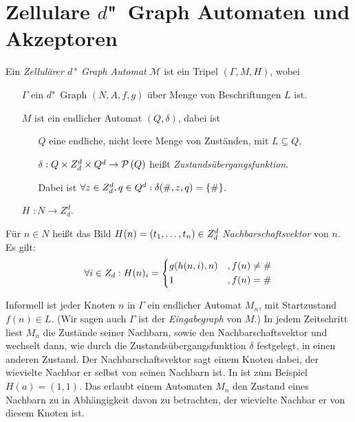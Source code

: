 \documentclass[11pt]{article}
\newcommand{\defWord}[1]{\emph{#1}}
\begin{document}
\section{Zellulare $d$"~Graph Automaten und Akzeptoren}

\begin{definition}
	Ein \defWord{Zellulärer $d$"~Graph Automat} $\mathcal{M}$ ist ein Tripel $\left(\Gamma, M, H\right)$, wobei
	\begin{itemize}
		\item[$\Gamma$] ein $d$"~Graph $\left(N, A, f, g\right)$ über Menge von Beschriftungen $L$ ist.
		\item[$M$] ist ein endlicher Automat $\left(Q, \delta\right)$, dabei ist 
		\begin{itemize}
			\item[$Q$] eine endliche, nicht leere Menge von Zuständen, mit $L \subseteq Q$,
			\item[$\delta$] $\cramped{: Q \times Z_d^d \times Q^d \rightarrow \mathcal{P}\left(Q\right)}$  heißt \defWord{Zustandsübergangsfunktion}.
			
			Dabei ist $\forall z \in Z_d^d, q \in Q^d : \cramped{\delta(\#, z, q) = \{\# \}}$.
		\end{itemize}
		\item[$H$] $: N \rightarrow Z_d^d$.  
	\end{itemize}
		Für $n \in N$ heißt das Bild $H(n) = \left(t_1, \text{\dots}, t_n\right) \in Z_d^d$ \defWord{Nachbarschaftsvektor} von $n$. Es gilt: 
		\begin{displaymath}
			\forall i \in Z_d : H(n)_i = 
			\begin{dcases}
				g(h(n, i), n) & ,f(n) \neq \# \\
				1 & , f(n) = \# \\ %
			\end{dcases}
		\end{displaymath}
\end{definition}

Informell ist jeder Knoten $n$ in $\Gamma$ ein endlicher Automat $M_n$, mit Startzustand $f(n) \in L$. 
(Wir sagen auch $\Gamma$ ist der \defWord{Eingabegraph} von $M$.) 
In jedem Zeitschritt liest $M_n$ die Zustände seiner Nachbarn, sowie den Nachbarschaftsvektor und wechselt dann, wie durch die Zustandsübergangsfunktion $\delta$ festgelegt, in einen anderen Zustand. 
Der Nachbarschaftsvektor sagt einem Knoten dabei, der wievielte Nachbar er selbst von seinen Nachbarn ist. 
In  ist zum Beispiel $H(a) = \left(1, 1\right)$. 
Das erlaubt einem Automaten $M_n$ den Zustand eines Nachbarn zu in Abhängigkeit davon zu betrachten, der wievielte Nachbar er von diesem Knoten ist.
\end{document}
